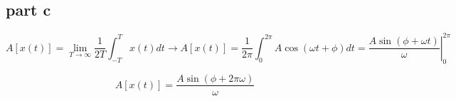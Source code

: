 \subsection{part c}
\label{sec:Q4c}
$$
A[x(t)] = \lim_{T\to\infty}\dfrac{1}{2T}\int_{-T}^T x(t)dt \to A[x(t)] = \dfrac{1}{2\pi} \int_{0}^{2\pi} A\cos(\omega t + \phi)dt = \left. \dfrac{A\sin(\phi + \omega t)}{\omega}
\right|_0^{2\pi}
$$

$$
A[x(t)] = \dfrac{A\sin(\phi + 2\pi\omega)}{\omega}
$$